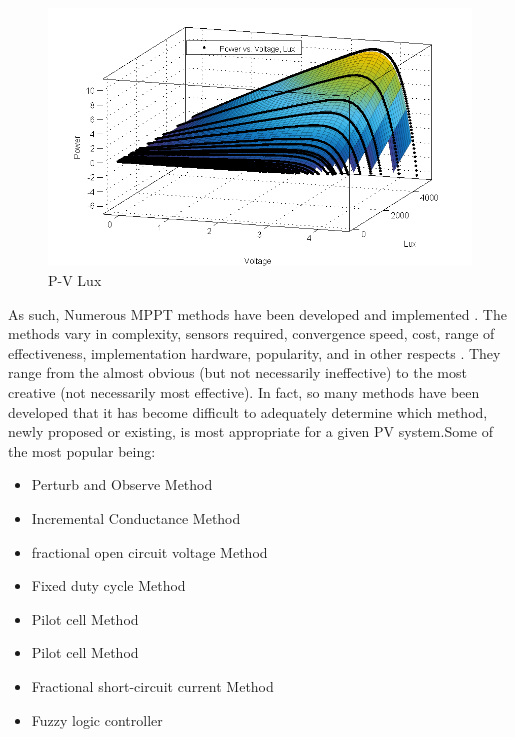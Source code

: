   \begin{figure}[H]
  \begin{center}
  \includegraphics[width=\textwidth]{images/PV_LUX}
  \caption{ P-V Lux}
  \label{fig:PVgraph}
  \end{center}
  \end{figure}

As such, Numerous \ac{MPPT} methods have been developed and implemented\cite{ngan2011study} \cite{esram2007comparison} \cite{eltawil2013mppt} . The methods vary in complexity, sensors required, convergence speed, cost, range of effectiveness, implementation hardware, popularity, and in other respects\cite{reza2013classification} \cite{dondi2008modeling}. They range from the almost obvious (but not necessarily ineffective) to the most creative (not necessarily most effective). In fact, so many methods have been developed that it has become difficult to adequately determine which method, newly proposed or existing, is most appropriate for a given PV system.Some of the most popular being: \\

  
\begin{itemize}
 \item Perturb and Observe Method
 \item Incremental Conductance Method
 \item fractional open circuit voltage Method
 \item Fixed duty cycle Method
 \item Pilot cell Method
 \item Pilot cell Method
 \item Fractional short-circuit current Method
 \item Fuzzy logic controller
\end {itemize}
 
